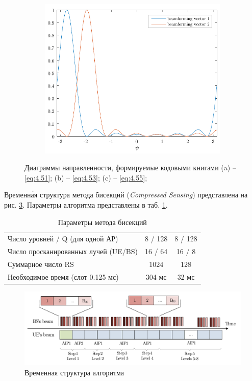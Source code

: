 \begin{figure}[ht!]
\begin{subfigure}{0.49\linewidth}
    \centering
    \includegraphics[width=\linewidth]{figs/fig4.22}
    \caption{}
    \label{fig:4.22}
\end{subfigure}
\caption{Диаграммы направленности, формируемые кодовыми книгами 
(a) -- \eqref{eq:4.51};
(b) -- \eqref{eq:4.53};
(c) -- \eqref{eq:4.55};
}
\label{fig:4.21-full}
\end{figure}

Временн\'{а}я структура метода бисекций (\textit{Compressed Sensing}) представлена на рис. \ref{fig:4.23}.
Параметры алгоритма представлены в таб. \ref{tab:4.5}.
\begin{table}[H]
    \centering
    \caption{Параметры метода бисекций}
    \label{tab:4.5}
    \begin{tabular}{lcc}
        \toprule
        \midrule
        Число уровней / Q (для одной АР)              & 8 / 128 & 8 / 128 \\
        Число просканированных \newline лучей (UE/BS) & 16 / 64 & 16 / 8  \\
        Суммарное число RS                            & 1024    & 128     \\
        Необходимое время (слот 0.125 мс)             & 304 мс  & 32 мс   \\
        \bottomrule
    \end{tabular}
\end{table}
\begin{figure}[H]
    \centering
    \includegraphics[width=\linewidth]{figs/fig4.23}
    \caption{Временная структура алгоритма \ACS}
    \label{fig:4.23}
\end{figure}
